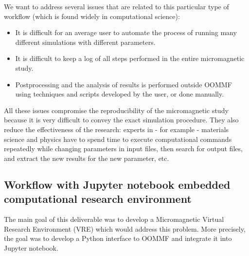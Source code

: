 \documentclass{deliverablereport}
\begin{document}
We want to address several issues that are related
to this particular type of workflow (which is found widely in
computational science):
\begin{itemize}
\item It is difficult for an average user to automate the process
of running many different simulations with different parameters.
\item It is difficult to keep a log of all steps performed in the
entire micromagnetic study.
\item Postprocessing and the analysis of results is performed outside
OOMMF using techniques and scripts developed by the user, or done manually.
\end{itemize}

All these issues compromise the reproducibility of the micromagnetic
study because it is very difficult to convey the exact simulation
procedure. They also reduce the effectiveness of the research: experts
in - for example - materials science and physics have to spend time to
execute computational commands repeatedly while changing parameters in
input files, then search for output files, and extract the new results
for the new parameter, etc.

\subsection{Workflow with Jupyter notebook embedded computational
  research environment}

The main goal of this deliverable was
to develop a Micromagnetic Virtual Research Environment (VRE) which
would address this problem. More precisely, the goal was to develop a
Python interface to OOMMF and integrate it into Jupyter
notebook.
\end{document}

